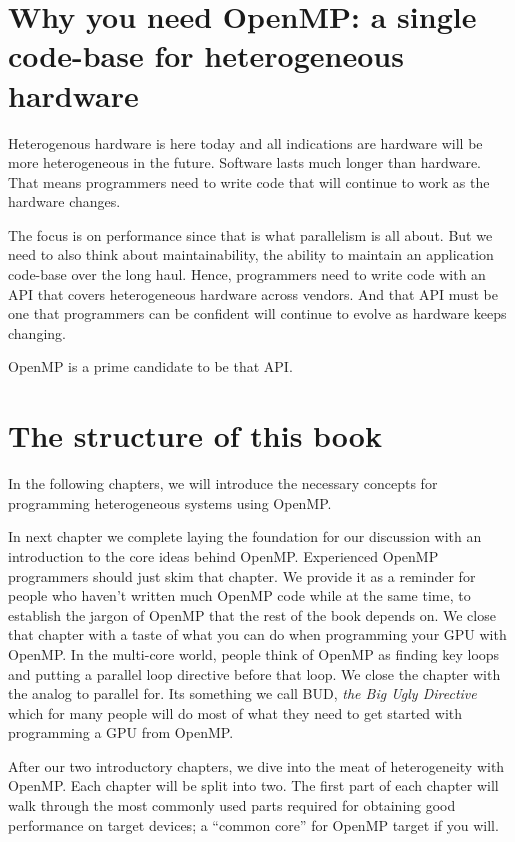 \section{Why you need OpenMP: a single code-base for heterogeneous hardware}

 Heterogenous hardware is here today and all indications are hardware will
be more heterogeneous in the future.  Software lasts much longer than hardware.   That means
programmers need to write code that will continue to work as the hardware changes.  

The focus is on performance since that is what parallelism is all about.  But we need to also think about 
maintainability, the ability to maintain an application code-base over the long haul.  Hence, programmers
need to write code with an API that covers heterogeneous hardware across vendors.  And that API
must be one that programmers can be confident will continue to evolve as hardware keeps changing.

OpenMP is a prime candidate to be that API.

\section{The structure of this book}

In the following chapters, we will introduce the necessary concepts for programming heterogeneous systems using OpenMP.

In next chapter we complete laying the foundation for our discussion with an introduction to the core ideas behind OpenMP. 
Experienced OpenMP programmers should just skim that chapter.  We provide 
it as a reminder for people who haven't written much OpenMP code while at the
same time, to establish the jargon of OpenMP that the rest of the book depends on.  We close that chapter with
a taste of what you can do when programming your GPU with OpenMP.   In the multi-core world, people think of OpenMP
as finding key loops and putting a parallel loop directive before that loop.  We close the chapter with the analog to parallel for.  
Its something we call BUD, \emph{the Big Ugly Directive} which for many people will do most of what they need to get started
with programming a GPU from OpenMP.

After our two introductory chapters, we dive into the meat of heterogeneity with OpenMP.  
Each chapter will be split into two.
The first part of each chapter will walk through the most commonly used parts required for obtaining 
good performance on target devices; a ``common core'' for OpenMP target if you will.

